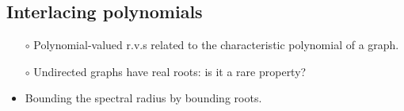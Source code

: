 \documentclass[20pt, a1paper, portrait, margin=0mm, innermargin=10mm,
     blockverticalspace=8mm, colspace=10mm, subcolspace=8mm]{tikzposter}
\theoremstyle{break}
\begin{document}
{\begin{minipage}[t]{0.23\textwidth}
      \subsection*{Interlacing polynomials}
      \begin{itemize}
          \item[$\circ$] Polynomial-valued r.v.s related to the
              characteristic polynomial of a graph.
          \item[$\circ$] Undirected graphs have real roots: is it a rare property?
          \item Bounding the spectral radius by bounding roots.
      \end{itemize}
  \end{minipage}
}
\end{document}
